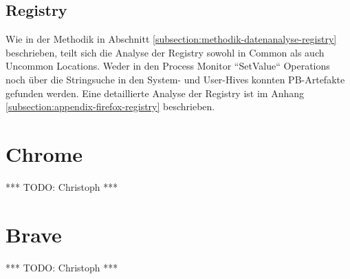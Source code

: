 \subsection*{Registry}
Wie in der Methodik in Abschnitt \ref{subsection:methodik-datenanalyse-registry} beschrieben, teilt sich die Analyse der Registry sowohl in Common als auch Uncommon Locations. Weder in den Process Monitor ``SetValue`` Operations noch über die Stringsuche in den System- und User-Hives konnten PB-Artefakte gefunden werden. Eine detaillierte Analyse der Registry ist im Anhang \ref{subsection:appendix-firefox-registry} beschrieben. 

\section{Chrome}

*** TODO: Christoph ***

%
%
	

\section{Brave}

*** TODO: Christoph ***